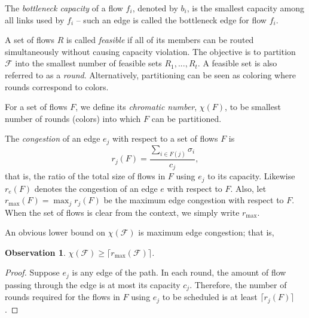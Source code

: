 \documentclass[a4paper,UKenglish]{lipics-v2016}
\theoremstyle{plain}
\newtheorem{observation}[theorem]{Observation}
\newcommand{\rmax}{r_{\max}}
\begin{document}
\begin{definition}
The {\em bottleneck capacity} of a flow $f_i$, denoted by $b_i$,
is the smallest capacity among all links used by $f_i$ – such an edge is called the bottleneck edge for flow $f_i$.
\end{definition}

A set of flows $R$ is called {\em feasible}\/ if all of its members can be routed simultaneously without causing capacity violation. The objective is to partition $\mathcal{F}$ into the smallest number of feasible sets $R_1, ..., R_t$. A feasible set is also referred to as a {\em round}.
Alternatively, partitioning can be seen as coloring where rounds correspond to colors. 
\begin{definition}
For a set of flows $F$, we define its {\em chromatic number}, $\chi(F)$, to be smallest number of rounds (colors) into which $F$ can be partitioned.
\end{definition}

\begin{definition}
The {\em congestion}\/ of an edge $e_j$ with respect to a set of flows $F$ is
\begin{equation}
r_j(F) = \frac{\sum_{i\in F(j) }\sigma_i}{c_j},
\end{equation}
that is, the ratio of the total size of flows in $F$ using $e_j$ to its capacity. Likewise $r_e(F)$ denotes the congestion of an edge $e$ with respect to $F$. Also, let $\rmax(F)= \max_j r_j(F)$ be the maximum edge congestion with respect to $F$. When the set of flows is clear from the context, we simply write $\rmax$.
\end{definition}
An obvious lower bound on $\chi(\mathcal{F})$ is maximum edge congestion; that is,
\begin{observation}
$\chi(\mathcal{F}) \geq \lceil \rmax(\mathcal{F}) \rceil$.
\end{observation}
\begin{proof}
Suppose $e_j$ is any edge of the path. In each round, the amount of flow passing through the edge is at most its capacity $c_j$. Therefore, the number of rounds required for the flows in $F$ using $e_j$ to be scheduled is at least $\lceil r_j(F) \rceil$.
\end{proof}
\end{document}
